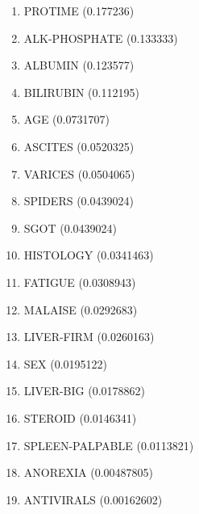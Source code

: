 \begin{enumerate}
\item PROTIME (0.177236)
\item ALK-PHOSPHATE (0.133333)
\item ALBUMIN (0.123577)
\item BILIRUBIN (0.112195)
\item AGE (0.0731707)
\item ASCITES (0.0520325)
\item VARICES (0.0504065)
\item SPIDERS (0.0439024)
\item SGOT (0.0439024)
\item HISTOLOGY (0.0341463)
\item FATIGUE (0.0308943)
\item MALAISE (0.0292683)
\item LIVER-FIRM (0.0260163)
\item SEX (0.0195122)
\item LIVER-BIG (0.0178862)
\item STEROID (0.0146341)
\item SPLEEN-PALPABLE (0.0113821)
\item ANOREXIA (0.00487805)
\item ANTIVIRALS (0.00162602)
\end{enumerate}